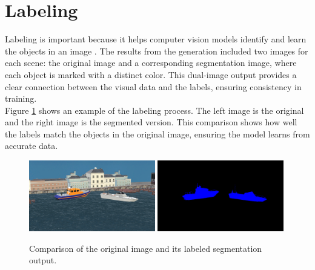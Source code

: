 \section{Labeling}
Labeling is important because it helps computer vision models identify and learn the objects in an image \cite{Labelling}.  The results from the generation included two images for each scene: the original image and a corresponding segmentation image, where each object is marked with a distinct color. This dual-image output provides a clear connection between the visual data and the labels, ensuring consistency in training.\\

\noindent Figure \ref{fig:labeled_images} shows an example of the labeling process. The left image is the original and the right image is the segmented version. This comparison shows how well the labels match the objects in the original image, ensuring the model learns from accurate data.

\begin{figure}[H]
\centering
\includegraphics[width=0.49\textwidth]{Figures/results/rgb_105.png}
\includegraphics[width=0.49\textwidth]{Figures/results/segmentation_105.png}
\caption{Comparison of the original image and its labeled segmentation output.}
\label{fig:labeled_images}
\end{figure}


